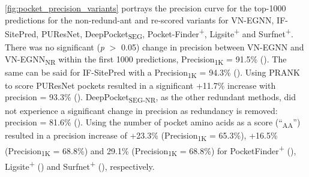 \autoref{fig:pocket_precision_variants} portrays the precision curve for the top-1000 predictions for the non-redund-ant and re-scored variants for VN-EGNN, IF-SitePred, PUResNet, DeepPocket\textsubscript{SEG}, Pocket-Finder\textsuperscript{+}, Ligsite\textsuperscript{+} and Surfnet\textsuperscript{+}. There was no significant (\textit{p} $>$ 0.05) change in precision between VN-EGNN and VN-EGNN\textsubscript{NR} within the first 1000 predictions, Precision\textsubscript{1K} = 91.5\% (). The same can be said for IF-SitePred with a Precision\textsubscript{1K} = 94.3\% (). Using PRANK to score PUResNet pockets resulted in a significant +11.7\% increase with precision = 93.3\% (). DeepPocket\textsubscript{SEG-NR}, as the other redundant methods, did not experience a significant change in precision as redundancy is removed: precision = 81.6\% (). Using the number of pocket amino acids as a score (``\textsubscript{AA}'') resulted in a precision increase of +23.3\% (Precision\textsubscript{1K} = 65.3\%), +16.5\% (Precision\textsubscript{1K} = 68.8\%) and 29.1\% (Precision\textsubscript{1K} = 68.8\%) for PocketFinder\textsuperscript{+} (), Ligsite\textsuperscript{+} () and Surfnet\textsuperscript{+} (), respectively.

